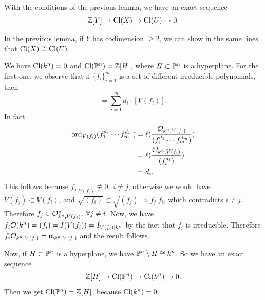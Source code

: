 \begin{dang}
    \begin{corollary}
        With the conditions of the previous lemma, we have an exact sequence 
        \begin{equation}
            \mathbb{Z}[Y]\to \text{Cl}(X) \to \text{Cl}(U)\to 0. 
        \end{equation}
    \end{corollary}
\end{dang}

\begin{remark}
    In the previous lemma, if $Y$ has codimension $\geq2$, we can show in the same lines that 
    $\text{Cl}(X)\cong \text{Cl}(U)$.
\end{remark}

\begin{example}
    We have $\text{Cl}(k^n)=0$ and $\text{Cl}(\mathbb{P}^n)=\mathbb{Z}[H]$, where $H\subset \mathbb{P}^n$ is a hyperplane. For the first one, we 
    observe that if $\{f_i\}_{i=1}^m$ is a set of different irreducible polynomials, then 
    \begin{equation}
        [\text{div}(f_1^{d_1}\cdots f_m^{d_m})] = \sum_{i=1}^m d_i\cdot[V(f_i)].
    \end{equation} 
    In fact
    \begin{equation}
        \begin{split}
            \text{ord}_{V(f_i)}(f_1^{d_1}\cdots f_m^{d_m}) &= \ell(\frac{\mathcal{O}_{k^n, V(f_i)}}{(f_1^{d_1}\cdots f_m^{d_m})})\\
         &=\ell(\frac{\mathcal{O}_{k^n, V(f_i)}}{(f_i^{d_i})})\\
         &=d_i.
        \end{split}
    \end{equation}
    This follows because $f_j|_{V(f_i)}\not\equiv 0,\;i\neq j$, otherwise we would have $V(f_j)\subset V(f_i)$, and 
    $\sqrt{(f_i)}\subset \sqrt{(f_j)}\Rightarrow f_j|f_i$, which contradicts $i\neq j$. Therefore 
    $f_j\in \mathcal{O}_{k^n, V(f_i)}^*,\;\forall j\neq i$. Now, we have 
    $f_i\mathcal{O}(k^n) = (f_i) = I(V(f_i)) = I_{V(f_i)|k^n}$ by the fact that $f_i$ is irreducible. 
    Therefore $f_i\mathcal{O}_{k^n, V(f_i)}=\mathfrak{m}_{k^n, V(f_i)}$ and the result follows.\par 
    Now, if $H\subset \mathbb{P}^n$ is a hyperplane, we have $\mathbb{P}^n\setminus H \cong k^n$. So we have an exact sequence 
    \begin{equation}
        \mathbb{Z}[H] \to \text{Cl}(\mathbb{P}^n)\to \text{Cl}(k^n) \to 0.
    \end{equation}
    Then we get $\text{Cl}(\mathbb{P}^n) = \mathbb{Z}[H]$, because $\text{Cl}(k^n)=0$.
\end{example}

